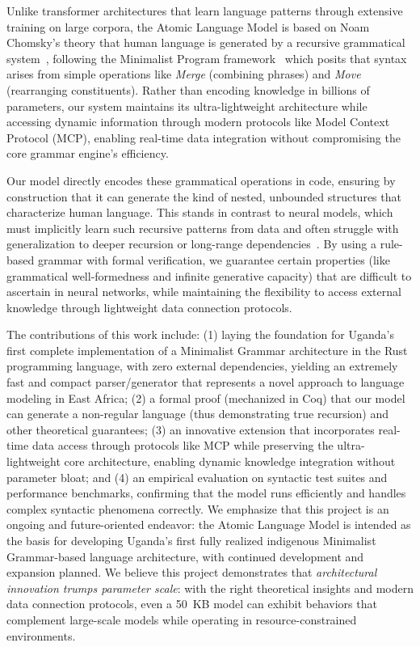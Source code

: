 \documentclass[11pt]{article}
\begin{document}
Unlike transformer architectures that learn language patterns through extensive training on large corpora, the Atomic Language Model is based on Noam Chomsky's theory that human language is generated by a recursive grammatical system~\cite{chomsky1956}, following the Minimalist Program framework~\cite{chomsky1995} which posits that syntax arises from simple operations like \emph{Merge} (combining phrases) and \emph{Move} (rearranging constituents). Rather than encoding knowledge in billions of parameters, our system maintains its ultra-lightweight architecture while accessing dynamic information through modern protocols like Model Context Protocol (MCP), enabling real-time data integration without compromising the core grammar engine's efficiency.

Our model directly encodes these grammatical operations in code, ensuring by construction that it can generate the kind of nested, unbounded structures that characterize human language. This stands in contrast to neural models, which must implicitly learn such recursive patterns from data and often struggle with generalization to deeper recursion or long-range dependencies~\cite{linzen2016, gulordava2018}. By using a rule-based grammar with formal verification, we guarantee certain properties (like grammatical well-formedness and infinite generative capacity) that are difficult to ascertain in neural networks, while maintaining the flexibility to access external knowledge through lightweight data connection protocols.

The contributions of this work include: (1) laying the foundation for Uganda's first complete implementation of a Minimalist Grammar architecture in the Rust programming language, with zero external dependencies, yielding an extremely fast and compact parser/generator that represents a novel approach to language modeling in East Africa; (2) a formal proof (mechanized in Coq) that our model can generate a non-regular language (thus demonstrating true recursion) and other theoretical guarantees; (3) an innovative extension that incorporates real-time data access through protocols like MCP while preserving the ultra-lightweight core architecture, enabling dynamic knowledge integration without parameter bloat; and (4) an empirical evaluation on syntactic test suites and performance benchmarks, confirming that the model runs efficiently and handles complex syntactic phenomena correctly. We emphasize that this project is an ongoing and future-oriented endeavor: the Atomic Language Model is intended as the basis for developing Uganda's first fully realized indigenous Minimalist Grammar-based language architecture, with continued development and expansion planned. We believe this project demonstrates that \emph{architectural innovation trumps parameter scale}: with the right theoretical insights and modern data connection protocols, even a 50~KB model can exhibit behaviors that complement large-scale models while operating in resource-constrained environments.
\end{document}
